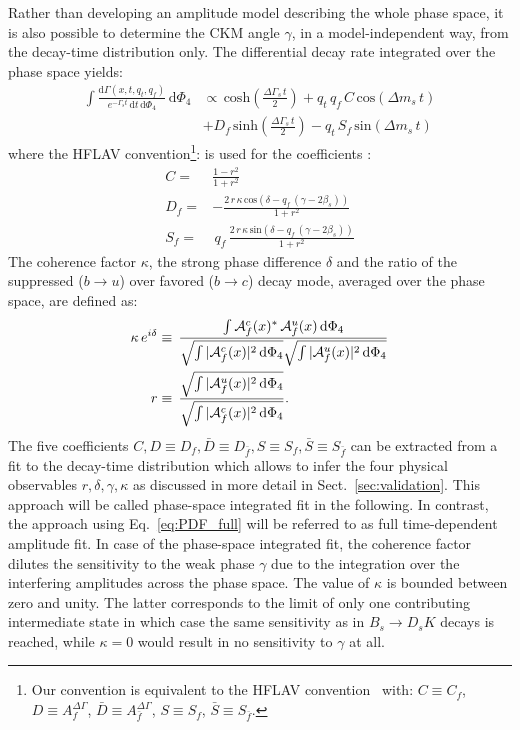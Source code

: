 Rather than developing an amplitude model describing the whole phase space,
it is also possible to determine the CKM angle $\gamma$, in a model-independent way, from the decay-time distribution only.
The differential decay rate  integrated over the phase space yields:
\begin{align}
\label{eq:PDF_intX}
	\nonumber
	\int \frac{\text{d}\Gamma(x,t,q_t,q_f)}{e^{- \Gamma_s t} \, \text{d}t \,  \text{d}\Phi_4}  \, \text{d}\Phi_4 &\propto    
	\, \text{cosh} \left( \frac{\Delta \Gamma_s \, t}{2}\right) 
	  + q_t \, q_f \, C \, \text{cos} \left( \Delta m_s \, t \right)   \\
	 & +  D_{f} \, \text{sinh} \left( \frac{\Delta \Gamma_s \, t}{2}\right)  
	  - q_t  \, S_{f}\, \text{sin} \left(\Delta m_s \, t \right)  
\end{align}
where the HFLAV convention\footnote{
Our convention is equivalent to the HFLAV convention~\cite{HFAG} with: 
$C\equiv C_f$,
$D\equiv A^{\Delta\Gamma}_f$,
$\bar D\equiv A^{\Delta\Gamma}_{\bar f}$,
$S\equiv S_f$,
$\bar S\equiv S_{\bar f}$.
}: is used for the \CP coefficients :
\begin{align}
\label{eq:CPcoeff}
	C= & \frac{1-r^2}{1+r^2}   \\
	D_{f} = &  -\frac{2 \, r \, \kappa \, \text{cos}\left(\delta-q_f \, (\gamma-2\beta_s)\right)}{1+r^2}   \\
	S_{f} = & \,  q_f \, \frac{2 \, r \, \kappa \, \text{sin}\left(\delta-q_f \, (\gamma-2\beta_s)\right)}{1+r^2}   
\end{align}
The coherence factor $\kappa$, the strong phase difference $\delta$ and the ratio of the suppressed ($b\to u$) over favored ($b\to c$) decay mode, averaged over the 
phase space, are defined as:
\begin{align}
\label{eq:coherenceFactor}
	\kappa \, e^{i\delta} &\equiv \, \frac{\int \mathcal A^c_f(x)^{*} \, \mathcal A^u_f(x)  \, \mathrm{d}\Phi_4}{\sqrt{\int \vert \mathcal A^c_f(x) \vert^2 \, \mathrm{d}\Phi_4} \sqrt{\int \vert \mathcal A^u_f(x) \vert^2 \, \mathrm{d}\Phi_4}  } \\
	r &\equiv \, \frac{\sqrt{\int \vert \mathcal A^u_f(x)\vert^2 \, \mathrm{d}\Phi_4 }}{\sqrt{\int \vert \mathcal A^c_f(x)\vert^2 \, \mathrm{d}\Phi_4}} .
\end{align}
The five \CP coefficients $C,D\equiv D_f,\bar D \equiv D_{\bar{f}},S \equiv S_f,\bar S \equiv S_{\bar{f}}$
can be extracted from a fit to the decay-time distribution
which allows to infer the four physical observables $r,\delta,\gamma,\kappa$ 
as discussed in more detail in Sect.~\ref{sec:validation}.
This approach will be called phase-space integrated fit in the following.
In contrast, the approach using Eq.~\ref{eq:PDF_full} will be referred to as full time-dependent amplitude fit. 
In case of the phase-space integrated fit, 
the coherence factor dilutes the sensitivity to the weak phase $\gamma$ due to the integration over the interfering amplitudes across the phase space.
The value of $\kappa$ is bounded between zero and unity.
The latter corresponds to the limit of only one contributing intermediate state in which case the same sensitivity as in $B_s \to D_s K$ decays is reached, 
while $\kappa = 0$ would result in no sensitivity to $\gamma$ at all.

